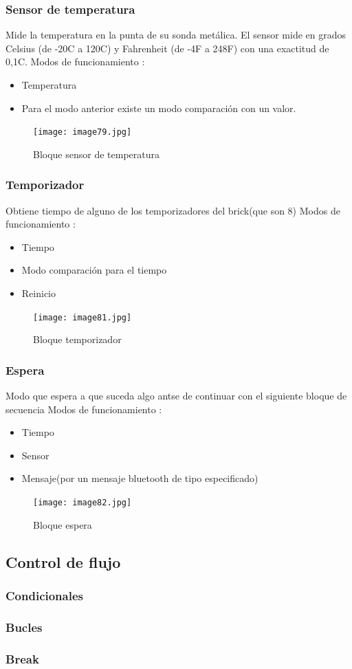 \documentclass[12pt,a4paper]{article}
\begin{document}
\subsubsection{Sensor de temperatura}
Mide la temperatura en la punta de su sonda
metálica. El sensor mide en grados Celsius (de
-20C a 120C) y Fahrenheit (de -4F a 248F)
con una exactitud de 0,1C.
Modos de funcionamiento :
\begin{itemize}
\item Temperatura
\item Para el modo anterior existe un modo comparación con un valor.
\end{itemize}
\begin{figure}[H]
	\caption{Bloque sensor de temperatura}
	\texttt{[image: image79.jpg]}
	\centering
\end{figure}
\subsubsection{Temporizador}
Obtiene tiempo de alguno de los temporizadores del brick(que son 8)
Modos de funcionamiento :
\begin{itemize}
\item Tiempo
\item Modo comparación para el tiempo
\item Reinicio
\end{itemize}
\begin{figure}[H]
	\caption{Bloque temporizador}
	\texttt{[image: image81.jpg]}
	\centering
\end{figure}
\subsubsection{Espera}
Modo que espera a que suceda algo antse de continuar con el siguiente bloque de secuencia
Modos de funcionamiento :
\begin{itemize}
\item Tiempo
\item Sensor
\item Mensaje(por un mensaje bluetooth de tipo especificado)
\end{itemize}
\begin{figure}[H]
	\caption{Bloque espera}
	\texttt{[image: image82.jpg]}
	\centering
\end{figure}
\subsection{Control de flujo}
\subsubsection{Condicionales}
\subsubsection{Bucles}
\subsubsection{Break}
\end{document}
